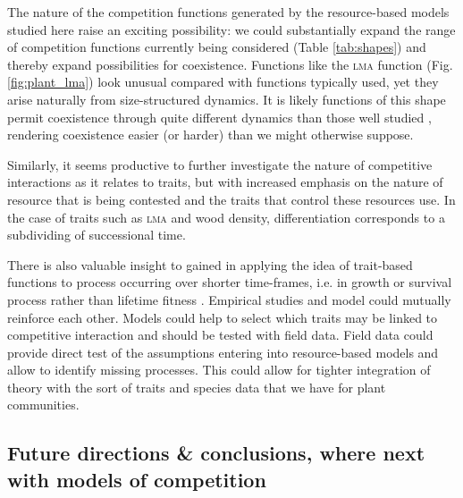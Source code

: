 \documentclass[a4paper,11pt]{article}
\begin{document}
The nature of the competition functions generated by the
resource-based models studied here raise an exciting possibility: we
could substantially expand the range of competition functions
currently being considered (Table \ref{tab:shapes}) and thereby expand
possibilities for coexistence. Functions like the \textsc {lma} function
(Fig. \ref{fig:plant_lma}) look unusual compared with functions
typically used, yet they arise naturally from size-structured
dynamics.  It is likely functions of this shape permit coexistence
through quite different dynamics than those well studied
\citep[e.g.][]{Leimar-2013}, rendering coexistence easier (or harder)
than we might otherwise suppose.

Similarly, it seems productive to further investigate the nature of
competitive interactions as it relates to traits, but with increased
emphasis on the nature of resource that is being contested and the traits that control these resources use. In the
case of traits such as \textsc{lma} and wood density, differentiation
corresponds to a subdividing of successional time.

There is also valuable insight to gained in applying the idea of
trait-based functions
to process occurring over shorter time-frames, i.e. in growth or
survival process rather than lifetime fitness
\citep[e.g.][]{Kunstler-2012, Lasky-2015, Kraft-2015}.  Empirical studies and model could mutually reinforce each other. Models could help to select which traits may be linked to competitive interaction and should be tested with field data. Field data could provide direct test of the assumptions entering into
resource-based models and allow to identify missing processes. This could allow for tighter integration of
theory with the sort of traits and species data that we have for plant
communities.

\subsection{Future directions \& conclusions, where next with models of
competition}
\end{document}
